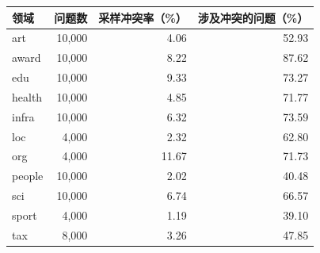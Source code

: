 \begin{tabular}{lrrr}
\toprule
领域 & 问题数 & 采样冲突率（\%） & 涉及冲突的问题（\%） \\
\midrule
art & 10,000 & 4.06 & 52.93 \\
award & 10,000 & 8.22 & 87.62 \\
edu & 10,000 & 9.33 & 73.27 \\
health & 10,000 & 4.85 & 71.77 \\
infra & 10,000 & 6.32 & 73.59 \\
loc & 4,000 & 2.32 & 62.80 \\
org & 4,000 & 11.67 & 71.73 \\
people & 10,000 & 2.02 & 40.48 \\
sci & 10,000 & 6.74 & 66.57 \\
sport & 4,000 & 1.19 & 39.10 \\
tax & 8,000 & 3.26 & 47.85 \\
\bottomrule
\end{tabular}
